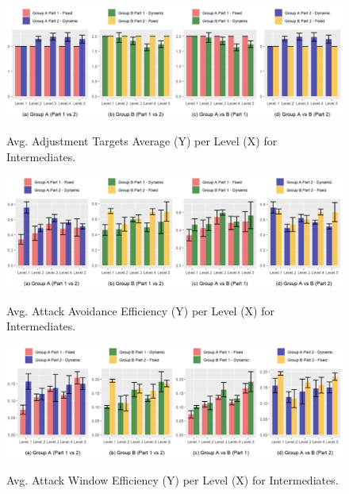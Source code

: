 \begin{figure}[!ht]
    \begin{center}
    \caption{Avg. Adjustment Targets Average (Y) per Level (X) for Intermediates.}
        \includegraphics[width=34em]{figures/adjustment_target_level-intermediate_players.png}
        \label{fig:result-metric-intermediate-adjustment-target-level}
    \end{center}
\end{figure}

\begin{figure}[!ht]
    \begin{center}
    \caption{Avg. Attack Avoidance Efficiency (Y) per Level (X) for Intermediates.}
        \includegraphics[width=34em]{figures/attack_avoidance_efficiency-intermediate_players.png}
        \label{fig:result-metric-intermediates-attack-avoidance-efficiency}
    \end{center}
\end{figure}

\begin{figure}[!ht]
    \begin{center}
    \caption{Avg. Attack Window Efficiency (Y) per Level (X) for Intermediates.}
        \includegraphics[width=34em]{figures/attack_window_efficiency-intermediate_players.png}
        \label{fig:result-metric-intermediates-attack-window-efficiency}
    \end{center}
\end{figure}

